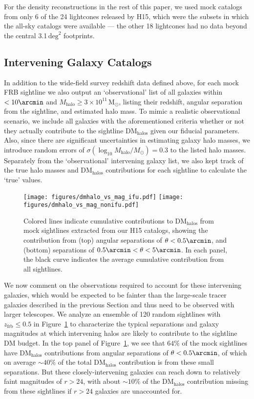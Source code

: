 \documentclass[twocolumn]{aastex63}
\newcommand{\dmhalo}{\ensuremath{\mathrm{DM}_\mathrm{halos}}}
\newcommand{\zfrb}{\ensuremath{z_\mathrm{frb}}}
\begin{document}
\begin{CJK*}{UTF8}{gbsn}
For the density reconstructions in the rest of this paper, we used mock catalogs from only 6 of the 24 lightcones released by H15, which were the subsets in which
the all-sky catalogs were available --- the other 18 lightcones had no data beyond the central 3.1$\,\mathrm{deg}^{2}$ footprints.

\subsection{Intervening Galaxy Catalogs}

In addition to the wide-field survey redshift data defined above, for each mock FRB sightline
we also output an `observational' list of all galaxies within $<10\arcmin$ and $M_\mathrm{halo} \geq 3 \times 10^{11} \,\mathrm{M}_\odot$, listing their redshift, angular separation from 
the sightline, and estimated halo mass. To mimic a realistic observational scenario, we include all galaxies
with the aforementioned criteria whether or not they actually contribute to the sightline \dmhalo{} given our fiducial parameters. Also, since there are significant uncertainties
in estimating galaxy halo masses, we introduce random errors of $\sigma (\log_{10} M_\mathrm{halo}/M_\odot) = 0.3$ to the listed halo masses. Separately from the `observational'
intervening galaxy list, we also kept track of the true halo masses and \dmhalo{} contributions
for each sightline to calculate the `true' values.

\begin{figure}
    \centering
    \texttt{[image: figures/dmhalo\_vs\_mag\_ifu.pdf]}
    \texttt{[image: figures/dmhalo\_vs\_mag\_nonifu.pdf]}
    \caption{Colored lines indicate cumulative contributions to \dmhalo{} from mock sightlines extracted from our H15 catalogs, showing the contribution from (top) angular
    separations of $\theta < 0.5\arcmin$, and (bottom) separations of $0.5\arcmin < \theta < 5\arcmin$. In each panel, the black curve indicates the average cumulative contribution
    from all sightlines.}
    \label{fig:dmhalo_vs_mag}
\end{figure}

We now comment on the observations required to account for these intervening
 galaxies, which would be expected to be fainter than the large-scale tracer
galaxies described in the previous Section and thus need to be observed with larger telescopes. 
We analyze an ensemble of 120 random sightlines with $\zfrb \leq 0.5$ in Figure~\ref{fig:dmhalo_vs_mag}
to characterize the typical separations and galaxy magnitudes at which intervening halos
are likely to contribute to the sightline DM budget. 
In the top panel of Figure~\ref{fig:dmhalo_vs_mag}, we see that $64\%$ of
the mock sightlines have \dmhalo{} contributions from angular separations of $\theta <0.5\arcmin$,
of which on average $\sim 40\%$ of the total \dmhalo{} contribution is from these small separations.
But these closely-intervening galaxies can reach down to relatively faint magnitudes of $r>24$,
with about $\sim 10\%$ of the \dmhalo{} contribution missing from these sightlines if 
$r>24$ galaxies are unaccounted for. 


\end{CJK*}
\end{document}
